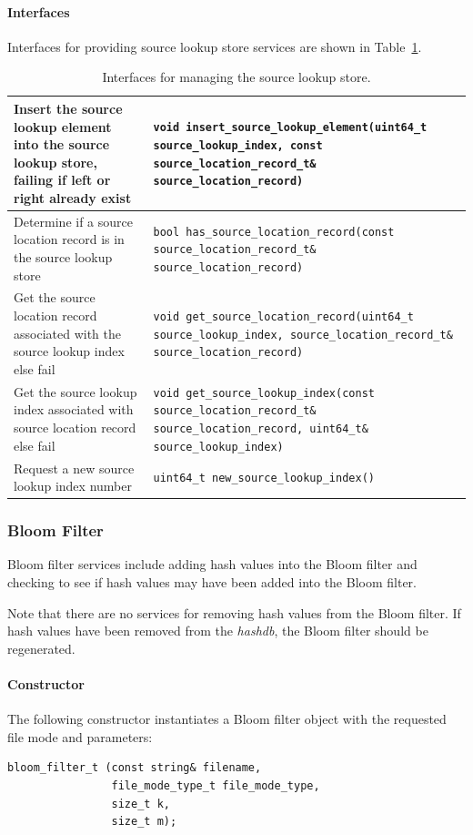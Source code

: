\documentclass[12pt,twoside]{article}
\newcommand{\hdb}{\emph{hashdb}\xspace}
\begin{document}
\paragraph{Interfaces}
Interfaces for providing source lookup store services
are shown in Table~\ref{source-lookup-store-interfaces}.
\begin{table}[h]
\center
\begin{tabular}{|p{2in}|p{4in}|}
\hline
Insert the source lookup element into the source lookup store, failing if left or right already exist & \texttt{void insert\_source\_lookup\_element(uint64\_t source\_lookup\_index, const source\_location\_record\_t\& source\_location\_record)} \\
\hline
Determine if a source location record is in the source lookup store & \texttt{bool has\_source\_location\_record(const source\_location\_record\_t\& source\_location\_record)} \\
\hline
Get the source location record associated with the source lookup index else fail & \texttt{void get\_source\_location\_record(uint64\_t source\_lookup\_index, source\_location\_record\_t\& source\_location\_record)} \\
\hline
Get the source lookup index associated with source location record else fail & \texttt{void get\_source\_lookup\_index(const source\_location\_record\_t\& source\_location\_record, uint64\_t\& source\_lookup\_index)} \\
\hline
Request a new source lookup index number & \texttt{uint64\_t new\_source\_lookup\_index()} \\
\hline
\end{tabular}
\caption{Interfaces for managing the source lookup store.\label{source-lookup-store-interfaces}}
\end{table}

\subsubsection{Bloom Filter}
Bloom filter services include adding hash values into the Bloom filter
and checking to see if hash values may have been added into the Bloom filter.

Note that there are no services for removing hash values from the Bloom filter.
If hash values have been removed from the \hdb, the Bloom filter should be regenerated.
\paragraph{Constructor}
The following constructor instantiates a Bloom filter object with the requested file mode and parameters:
\begin{small}
\begin{verbatim}
bloom_filter_t (const string& filename,
                file_mode_type_t file_mode_type,
                size_t k,
                size_t m);
\end{verbatim}
\end{small}
\end{document}
